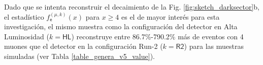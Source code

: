 Dado que se intenta reconstruir el decaimiento de la Fig. \ref{fig:sketch_darksector}b, el estadístico $f^{(\mu, k)}_\textsf{e} (x)$ para $x \geq 4$ es el de mayor interés para esta investigación, el mismo muestra como la configuración del detector en Alta Luminosidad ($k=\textsf{HL}$) reconstruye entre 86.7\%-790.2\% más de eventos con 4 muones que el detector en la configuración Run-2 ($k=\textsf{R2}$) para las muestras simuladas (ver Tabla \ref{table_genera_v5_value}).

